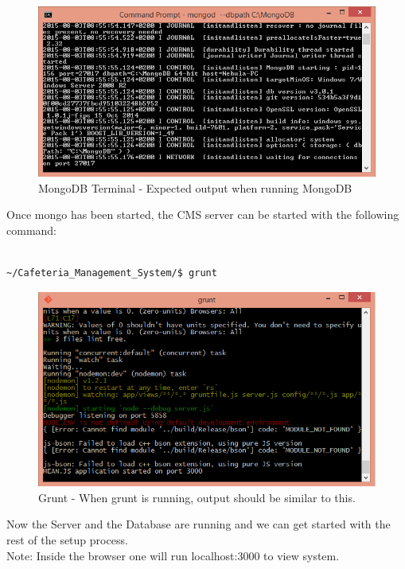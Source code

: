 \documentclass[a4paper,12pt]{article}
\begin{document}
\begin{figure}[H]
  \centering
    \includegraphics[width=1.0\textwidth]{screenshots/MongoDB.png}
    \caption{MongoDB Terminal - Expected output when running MongoDB} 
\end{figure}

Once mongo has been started, the CMS server can be started with the following command:\\ \\

\begin{verbatim}
~/Cafeteria_Management_System/$ grunt
\end{verbatim}

\begin{figure}[H]
  \centering
    \includegraphics[width=1.0\textwidth]{screenshots/gruntOutput.png}
    \caption{Grunt - When grunt is running, output should be similar to this.} 
\end{figure}

Now the Server and the Database are running and we can get started with the rest of the setup process. \\
Note: Inside the browser one will run localhost:3000 to view system. \\ 
\end{document}
